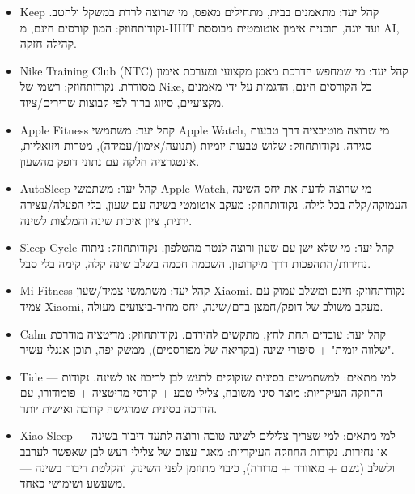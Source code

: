 
\begin{itemize}
  \item Keep קהל יעד: מתאמנים בבית, מתחילים מאפס, מי שרוצה לרדת במשקל ולחטב. נקודותחוזק: המון קורסים חינם, מ-HIIT ועד יוגה, תוכנית אימון אוטומטית מבוססת AI, קהילה חזקה.
  \item Nike Training Club (NTC) קהל יעד: מי שמחפש הדרכת מאמן מקצועי ומערכת אימון מסודרת. נקודותחוזק: רשמי של Nike, כל הקורסים חינם, הדגמות על ידי מאמנים מקצועיים, סיווג ברור לפי קבוצות שרירים/ציוד.
  \item Apple Fitness קהל יעד: משתמשי Apple Watch, מי שרוצה מוטיבציה דרך טבעות סגירה. נקודותחוזק: שלוש טבעות יומיות (תנועה/אימון/עמידה), מטרות ויזואליות, אינטגרציה חלקה עם נתוני דופק מהשעון.
\end{itemize}


\begin{itemize}
  \item AutoSleep קהל יעד: משתמשי Apple Watch, מי שרוצה לדעת את יחס השינה העמוקה/קלה בכל לילה. נקודותחוזק: מעקב אוטומטי בשינה עם שעון, בלי הפעלה/עצירה ידנית, ציון איכות שינה והמלצות לשינה.
  \item Sleep Cycle קהל יעד: מי שלא ישן עם שעון ורוצה לנטר מהטלפון. נקודותחוזק: ניתוח נחירות/התהפכות דרך מיקרופון, השכמה חכמה בשלב שינה קלה, קימה בלי סבל.
  \item Mi Fitness קהל יעד: משתמשי צמיד/שעון Xiaomi. נקודותחוזק: חינם ומשלב עמוק עם צמיד Xiaomi, מעקב משולב של דופק/חמצן בדם/שינה, יחס מחיר-ביצועים מעולה.
\end{itemize}


\begin{itemize}
  \item Calm קהל יעד: עובדים תחת לחץ, מתקשים להירדם. נקודותחוזק: מדיטציה מודרכת "שלווה יומית" + סיפורי שינה (בקריאה של מפורסמים), ממשק יפה, תוכן אנגלי עשיר.
  \item Tide — למי מתאים: למשתמשים בסינית שזקוקים לרעש לבן לריכוז או לשינה. נקודות החוזקה העיקריות: מוצר סיני משובח, צלילי טבע + קורסי מדיטציה + פומודורו, עם הדרכה בסינית שמרגישה קרובה ואישית יותר.
  \item Xiao Sleep — למי מתאים: למי שצריך צלילים לשינה טובה ורוצה לתעד דיבור בשינה או נחירות. נקודות החוזקה העיקריות: מאגר עצום של צלילי רעש לבן שאפשר לערבב ולשלב (גשם + מאוורר + מדורה), כיבוי מתוזמן לפני השינה, והקלטת דיבור בשינה — משעשע ושימושי כאחד.
\end{itemize}

